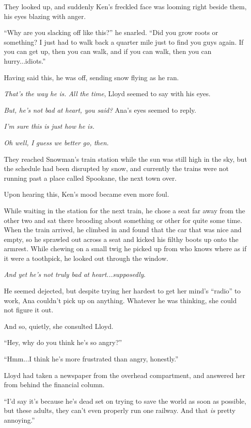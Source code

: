 \documentclass[
]{article}
\begin{document}
They looked up, and suddenly Ken's freckled face was looming right
beside them, his eyes blazing with anger.

``Why are you slacking off like this?'' he snarled. ``Did you grow roots
or something? I just had to walk back a quarter mile just to find you
guys again. If you can get up, then you can walk, and if you can walk,
then you can hurry...idiots.''

Having said this, he was off, sending snow flying as he ran.

\emph{That's the way he is. All the time}, Lloyd seemed to say with his
eyes.

\emph{But, he's not bad at heart, you said?} Ana's eyes seemed to reply.

\emph{I'm sure this is just how he is.}

\emph{Oh well, I guess we better go, then.}

They reached Snowman's train station while the sun was still high in the
sky, but the schedule had been disrupted by snow, and currently the
trains were not running past a place called Spookane, the next town
over.

Upon hearing this, Ken's mood became even more foul.

While waiting in the station for the next train, he chose a seat far
away from the other two and sat there brooding about something or other
for quite some time. When the train arrived, he climbed in and found
that the car that was nice and empty, so he sprawled out across a seat
and kicked his filthy boots up onto the armrest. While chewing on a
small twig he picked up from who knows where as if it were a toothpick,
he looked out through the window.

\emph{And yet he's not truly bad at heart...supposedly}.

He seemed dejected, but despite trying her hardest to get her mind's
``radio'' to work, Ana couldn't pick up on anything. Whatever he was
thinking, she could not figure it out.

And so, quietly, she consulted Lloyd.

``Hey, why do you think he's so angry?''

``Hmm...I think he's more frustrated than angry, honestly.''

Lloyd had taken a newspaper from the overhead compartment, and answered
her from behind the financial column.

``I'd say it's because he's dead set on trying to save the world as soon
as possible, but these adults, they can't even properly run one railway.
And that \emph{is} pretty annoying.''
\end{document}

